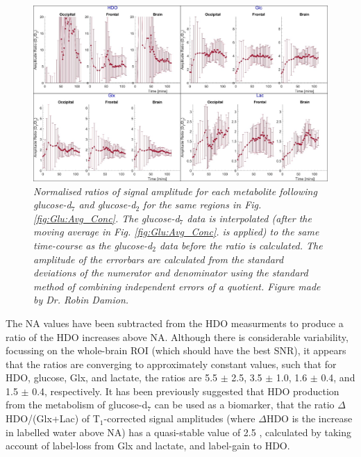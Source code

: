 \begin{figure}
    \centering
    \includegraphics[width = 1\textwidth]{Figures/Glucose/D7_D2.png}
    \caption{\textit{Normalised ratios of signal amplitude for each metabolite following glucose-d$_7$ and glucose-d$_2$ for the same regions in Fig. \ref{fig:Glu:Avg_Conc}. The glucose-d$_7$ data is interpolated (after the moving average in Fig. \ref{fig:Glu:Avg_Conc}. is applied) to the same time-course as the glucose-d$_2$ data before the ratio is calculated. The amplitude of the errorbars are calculated from the standard deviations of the numerator and denominator using the standard method of combining independent errors of a quotient. Figure made by Dr. Robin Damion.}}
    \label{fig:Glu:D7_D2}
\end{figure}

The \ac{NA} values have been subtracted from the \ac{HDO} measurments to produce a ratio of the \ac{HDO} increases above \ac{NA}. Although there is considerable variability, focussing on the whole-brain \ac{ROI} (which should have the best \ac{SNR}), it appears that the ratios are converging to approximately constant values, such that for \ac{HDO}, glucose, Glx, and lactate, the ratios are 5.5 $\pm$ 2.5, 3.5 $\pm$ 1.0, 1.6 $\pm$ 0.4, and 1.5 $\pm$ 0.4, respectively. It has been previously suggested that \ac{HDO} production from the metabolism of glucose-d$_7$ can be used as a biomarker, that the ratio $\Delta$HDO/(Glx+Lac) of T$_1$-corrected signal amplitudes (where $\Delta$HDO is the increase in labelled water above \ac{NA}) has a quasi-stable value of 2.5 \cite{Mahar2021DeuteratedGlucose}, calculated by taking account of label-loss from Glx and lactate, and label-gain to \ac{HDO}. 

